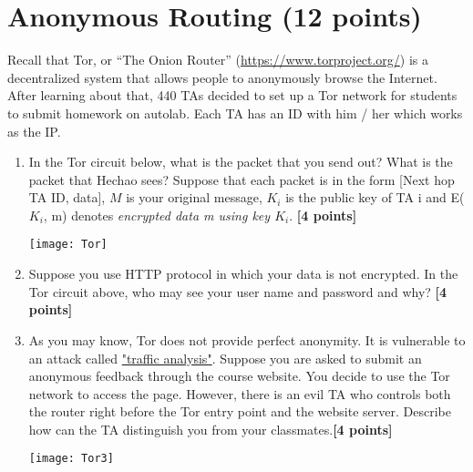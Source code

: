 \documentclass{article}
\begin{document}
\section{Anonymous Routing (12 points)}
Recall that Tor, or “The Onion Router” (\url{https://www.torproject.org/}) is a decentralized system that allows people to anonymously browse the Internet. After learning about that, 440 TAs decided to set up a Tor network for students to submit homework on autolab. Each TA has an ID with him / her which works as the IP. 
\begin{enumerate}
\item In the Tor circuit below, what is the packet that you send out? What is the packet that Hechao sees? Suppose that each packet is in the form [Next hop TA ID, data], $M$ is your original message, $K_i$ is the public key of TA i and E($K_i$, m) denotes \textit{encrypted data m using key $K_i$}. \textbf{[4 points]}

\texttt{[image: Tor]}


\item Suppose you use HTTP protocol in which your data is not encrypted. In the Tor circuit above, who may see your user name and password and why? \textbf{[4 points]}


\item As you may know, Tor does not provide perfect anonymity. It is vulnerable to an attack called \href{https://en.wikipedia.org/wiki/Traffic_analysis}{"traffic analysis"}. Suppose you are asked to submit an anonymous feedback through the course website. You decide to use the Tor network to access the page. However, there is an evil TA who controls both the router right before the Tor entry point and the website server. Describe how can the TA distinguish you from your classmates.\textbf{[4 points]}

\texttt{[image: Tor3]}

\end{enumerate}
\end{document}
